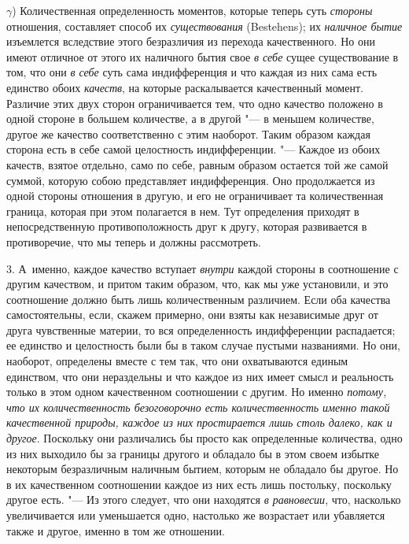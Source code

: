 $\gamma$) Количественная определенность моментов, которые теперь суть
{\em стороны} отношения, составляет способ их {\em существования} (Bestehens);
их {\em наличное бытие} изъемлется вследствие этого безразличия из перехода
качественного. Но они имеют отличное от этого их наличного бытия свое {\em в
себе} сущее существование в том, что они {\em в себе} суть сама индифференция и
что каждая из них сама есть единство обоих {\em качеств}, на которые
раскалывается качественный момент. Различие этих двух сторон ограничивается
тем, что одно качество положено в одной стороне в большем количестве, а в
другой "--- в меньшем количестве, другое же качество соответственно с этим
наоборот. Таким образом каждая сторона есть в себе самой целостность
индифференции. "--- Каждое из обоих качеств, взятое отдельно, само по себе,
равным образом остается той же самой суммой, которую собою представляет
индифференция. Оно продолжается из одной стороны отношения в другую, и его не
ограничивает та количественная граница, которая при этом полагается в нем. Тут
определения приходят в непосредственную противоположность друг к другу, которая
развивается в противоречие, что мы теперь и должны рассмотреть.

3. А~именно, каждое качество вступает {\em внутри} каждой стороны в соотношение
с другим качеством, и притом таким образом, что, как мы уже установили, и это
соотношение должно быть лишь количественным различием. Если оба качества
самостоятельны, если, скажем примерно, они взяты как независимые друг от друга
чувственные материи, то вся определенность индифференции распадается; ее
единство и целостность были бы в таком случае пустыми названиями. Но они,
наоборот, определены вместе с тем так, что они охватываются единым единством,
что они нераздельны и что каждое из них имеет смысл и реальность только в этом
одном качественном соотношении с другим. Но именно {\em потому, что их
количественность безоговорочно есть количественность именно такой качественной
природы, каждое из них простирается лишь столь далеко, как и другое}. Поскольку
они различались бы просто как определенные количества, одно из них выходило бы
за границы другого и обладало бы в этом своем избытке некоторым безразличным
наличным бытием, которым не обладало бы другое. Но в их качественном
соотношении каждое из них есть лишь постольку, поскольку другое есть. "--- Из
этого следует, что они находятся {\em в равновесии}, что, насколько
увеличивается или уменьшается одно, настолько же возрастает или убавляется
также и другое, именно в том же отношении.

